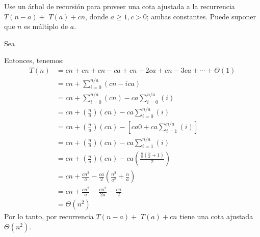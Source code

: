 \begin{problema}
    Use un árbol de recursión para proveer una cota ajustada a la recurrencia $T(n-a)+$ $T(a)+c n$, donde $a \geq 1, c>0$; ambas constantes. Puede suponer que $n$ es múltiplo de $a$.
    \begin{sol}
        Sea 
        \begin{figure}[H]
            \centering 
            \begin{minipage}[b]{0.5\linewidth}
            \centering
            \end{minipage}
            \begin{minipage}[b]{.1\linewidth}
            \centering
            \end{minipage}
            \end{figure}
            Entonces, tenemos: 
            \begin{align*}
                T(n)&= cn +cn + cn -ca + cn-2ca + cn-3ca +\cdots+ \Theta(1)\\
                    &= cn + \sum_{i=0}^{n/a}\left(cn-ica\right)\\
                    &= cn + \sum_{i=0}^{n/a}\left(cn\right)- ca\sum_{i=0}^{n/a}\left(i\right)\\
                    &= cn + \left(\frac{n}{a}\right)\left(cn\right)- ca\sum_{i=0}^{n/a}\left(i\right)\\
                    &= cn + \left(\frac{n}{a}\right)\left(cn\right)- \left[ca 0 + ca\sum_{i=1}^{n/a}\left(i\right)\right]\\
                    &= cn + \left(\frac{n}{a}\right)\left(cn\right)- ca\sum_{i=1}^{n/a}\left(i\right) \\
                    &= cn + \left(\frac{n}{a}\right)\left(cn\right)- ca\left(\frac{\frac{n}{a}\left(\frac{n}{a}+1\right)}{2}\right) \\
                    &= cn + \frac{cn^2}{a}- \frac{ca}{2}\left(
                        \frac{n^2}{a^2}+ \frac{n}{a}
                    \right) \\
                    &= cn + \frac{cn^2}{a}- \frac{cn^2}{2a}-\frac{cn}{2}\\
                    &= \Theta(n^2)
            \end{align*}
            Por lo tanto, por recurrencia $T(n-a)+$ $T(a)+c n$ tiene una cota ajustada $\Theta(n^2)$. 
    \end{sol}


\end{problema}
